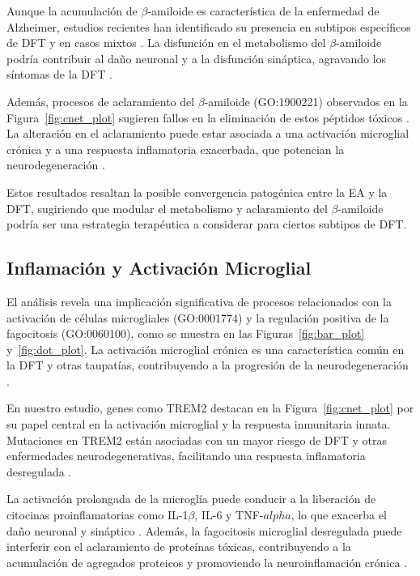 Aunque la acumulación de \(\beta\)-amiloide es característica de la enfermedad de Alzheimer, estudios recientes han identificado su presencia en subtipos específicos de DFT y en casos mixtos \cite{hardy2002amyloid, ling2010frontotemporal}. La disfunción en el metabolismo del \(\beta\)-amiloide podría contribuir al daño neuronal y a la disfunción sináptica, agravando los síntomas de la DFT \cite{selkoe2002alzheimers}.

Además, procesos de aclaramiento del \(\beta\)-amiloide (GO:1900221) observados en la Figura~\ref{fig:cnet_plot} sugieren fallos en la eliminación de estos péptidos tóxicos \cite{heneka2015neuroinflammation}. La alteración en el aclaramiento puede estar asociada a una activación microglial crónica y a una respuesta inflamatoria exacerbada, que potencian la neurodegeneración \cite{chen2016microglia}.

Estos resultados resaltan la posible convergencia patogénica entre la EA y la DFT, sugiriendo que modular el metabolismo y aclaramiento del \(\beta\)-amiloide podría ser una estrategia terapéutica a considerar para ciertos subtipos de DFT.


\subsection{Inflamación y Activación Microglial}

El análisis revela una implicación significativa de procesos relacionados con la activación de células microgliales (GO:0001774) y la regulación positiva de la fagocitosis (GO:0060100), como se muestra en las Figuras~\ref{fig:bar_plot} y~\ref{fig:dot_plot}. La activación microglial crónica es una característica común en la DFT y otras taupatías, contribuyendo a la progresión de la neurodegeneración \cite{heneka2015neuroinflammation, rajendran2009microglia}.

En nuestro estudio, genes como TREM2 destacan en la Figura~\ref{fig:cnet_plot} por su papel central en la activación microglial y la respuesta inmunitaria innata. Mutaciones en TREM2 están asociadas con un mayor riesgo de DFT y otras enfermedades neurodegenerativas, facilitando una respuesta inflamatoria desregulada \cite{yeh2016trem2, ulland2017trem2}.

La activación prolongada de la microglía puede conducir a la liberación de citocinas proinflamatorias como IL-1\(\beta\), IL-6 y TNF-\(alpha\), lo que exacerba el daño neuronal y sináptico \cite{block2007microglia}. Además, la fagocitosis microglial desregulada puede interferir con el aclaramiento de proteínas tóxicas, contribuyendo a la acumulación de agregados proteicos y promoviendo la neuroinflamación crónica \cite{lull2010microglial}.

